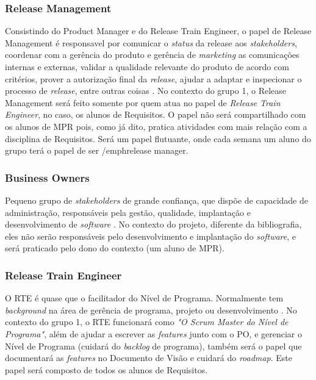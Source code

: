 \subsubsection{Release Management}
Consistindo do Product Manager e do Release Train Engineer, o papel de Release Management é responsavel por comunicar o \emph{status} da release aos \emph{stakeholders}, coordenar com a gerência do produto e gerência de \emph{marketing} as comunicações internas e externas, validar a qualidade relevante do produto de acordo com critérios, prover a autorização final da \emph{release}, ajudar a adaptar e inspecionar o processo de \emph{release}, entre outras coisas \cite{safesite001}.
No contexto do grupo 1, o Release Management será feito somente por quem atua no papel de \emph{Release Train Engineer}, no caso, os alunos de Requisitos. O papel não será compartilhado com os alunos de MPR pois, como já dito, pratica atividades com mais relação com a disciplina de Requisitos. Será um papel flutuante, onde cada semana um aluno do grupo terá o papel de ser /emph{release manager}.

\subsubsection{Business Owners}
Pequeno grupo de \emph{stakeholders} de grande confiança, que dispõe de capacidade de administração, responsáveis pela gestão, qualidade, implantação e desenvolvimento de \emph{software} \cite{safesite001}. No contexto do projeto, diferente da bibliografia, eles não serão responsáveis pelo desenvolvimento e implantação do \emph{software}, e será praticado pelo dono do contexto (um aluno de MPR).

\subsubsection{Release Train Engineer}
O RTE é quase que o facilitador do Nível de Programa. Normalmente tem \emph{background} na área de gerência de programa, projeto ou desenvolvimento \cite{safesite005}. No contexto do grupo 1, o RTE funcionará como \emph{"O Scrum Master do Nível de Programa"}, além de ajudar a escrever as \emph{features} junto com o PO, e gerenciar o Nível de Programa (cuidará do \emph{backlog} de programa), também será o papel que documentará as \emph{features} no Documento de Visão e cuidará do \emph{roadmap}. Este papel será composto de todos os alunos de Requisitos.


